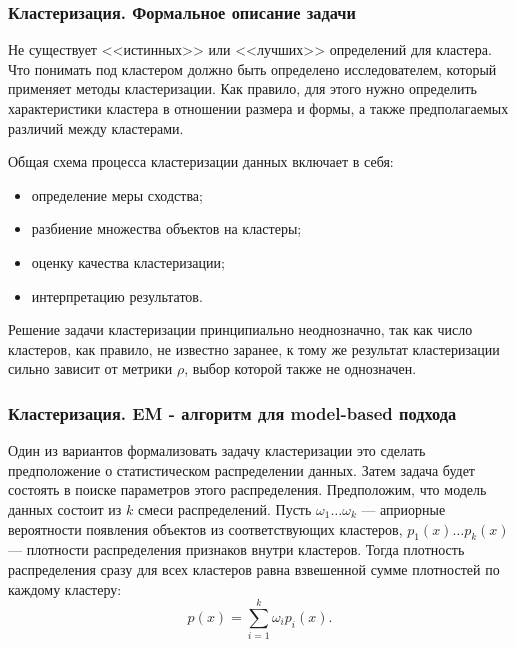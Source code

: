 \documentclass[notheorems, handout]{beamer}
\begin{document}
	\begin{frame}
	\frametitle{Кластеризация. Формальное описание задачи}
		Не существует <<истинных>> или <<лучших>> определений для кластера. Что понимать под кластером должно быть определено исследователем, который применяет методы кластеризации. Как правило, для этого нужно определить характеристики кластера в отношении размера и формы, а также предполагаемых различий между кластерами.

		Общая схема процесса кластеризации данных включает в себя: 
		\begin{itemize}
			\item определение меры сходства;
			\item разбиение множества объектов на кластеры;
			\item оценку качества кластеризации;
			\item интерпретацию результатов.
		\end{itemize}
	
		Решение задачи кластеризации принципиально неоднозначно, так как число кластеров, как правило, не известно заранее, к тому же результат кластеризации сильно зависит от метрики $\rho$, выбор которой также не однозначен.
 
	\end{frame}
	
	\begin{frame}
	\frametitle{Кластеризация. EM - алгоритм для model-based подхода}
		Один из вариантов формализовать задачу кластеризации это сделать предположение о статистическом распределении данных. Затем задача будет состоять в поиске параметров этого распределения. Предположим, что модель данных состоит из $k$ смеси распределений. Пусть $\omega_{1}\ldots \omega_{k}$ --- априорные вероятности появления объектов из соответствующих кластеров, $p_{1}(x)\ldots p_{k}(x)$ --- плотности распределения признаков внутри кластеров. Тогда плотность распределения сразу для всех кластеров равна взвешенной сумме плотностей по каждому кластеру:
		$$
		p(x) = \sum\limits_{i=1}^k \omega_{i} p_{i}(x).
		$$
 
	\end{frame}
	
\end{document}
